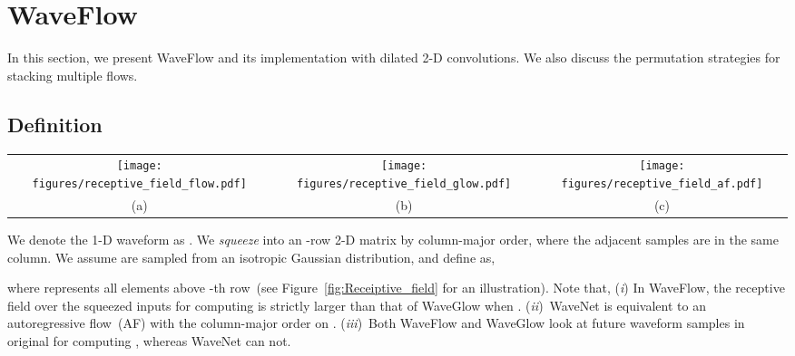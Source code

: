 \documentclass{article}
\begin{document}
\vspace{-.2em}
\section{WaveFlow}
\label{sec:waveflow}
\vspace{-.1em}
In this section, we present WaveFlow and its implementation with dilated 2-D convolutions. We also discuss the permutation strategies for stacking multiple flows.
\vspace{-.2em}
\subsection{Definition}
\label{subsec:definition}
\vspace{-.1em}
\begin{figure*}[t] \centering
\begin{tabular}{ccc}
\texttt{[image: figures/receptive\_field\_flow.pdf]} 
&\hspace{1.0cm}
\texttt{[image: figures/receptive\_field\_glow.pdf]} 
&\hspace{1.0cm}
\texttt{[image: figures/receptive\_field\_af.pdf]} 
\\
\vspace{-.3em}
{\small (a)}  & \hspace{1.0cm}  {\small(b)} & \hspace{1.0cm} {\small(c)} 
\\
\end{tabular}
\vspace{-.5em}
\caption{The receptive fields over the squeezed inputs  for computing  in  (a)~WaveFlow, (b)~WaveGlow, and (c)~autoregressive flow with column-major order~(e.g., WaveNet).}
\vspace{-.3em}
\label{fig:Receiptive_field} \end{figure*}
We denote the 1-D waveform as .
We \emph{squeeze}  into an -row 2-D matrix  by column-major order, where the adjacent samples are in the same column. We assume  are sampled from an isotropic Gaussian distribution, and define  as,

where  represents all elements above -th row~(see Figure~\ref{fig:Receiptive_field} for an illustration).
Note that, (\emph{i}) In WaveFlow, the receptive field over the squeezed inputs  for computing   is strictly larger than that of WaveGlow when .
(\emph{ii})~WaveNet is equivalent to an autoregressive flow~(AF) with the column-major order on . 
(\emph{iii})~Both WaveFlow and WaveGlow look at future waveform samples in original  for computing , whereas WaveNet can not.
\end{document}
